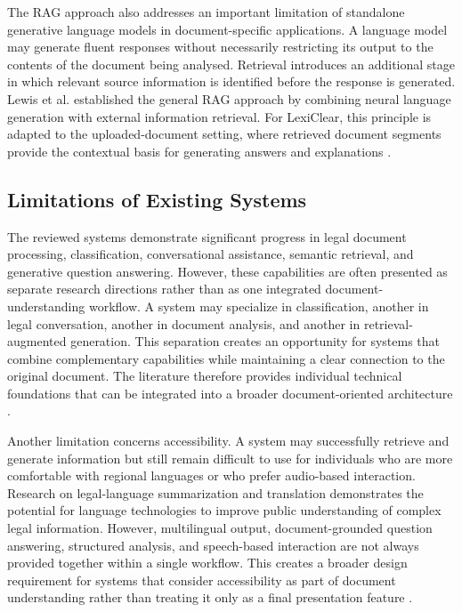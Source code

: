 \documentclass[12pt,a4paper,oneside]{report}
\begin{document}
The RAG approach also addresses an important limitation of standalone
generative language models in document-specific applications. A language
model may generate fluent responses without necessarily restricting its
output to the contents of the document being analysed. Retrieval introduces
an additional stage in which relevant source information is identified before
the response is generated. Lewis et al. established the general RAG approach
by combining neural language generation with external information retrieval.
For LexiClear, this principle is adapted to the uploaded-document setting,
where retrieved document segments provide the contextual basis for generating
answers and explanations
\cite{lewis2020rag,jurisai2025}.

\subsection{Limitations of Existing Systems}

The reviewed systems demonstrate significant progress in legal document
processing, classification, conversational assistance, semantic retrieval,
and generative question answering. However, these capabilities are often
presented as separate research directions rather than as one integrated
document-understanding workflow. A system may specialize in classification,
another in legal conversation, another in document analysis, and another in
retrieval-augmented generation. This separation creates an opportunity for
systems that combine complementary capabilities while maintaining a clear
connection to the original document. The literature therefore provides
individual technical foundations that can be integrated into a broader
document-oriented architecture
\cite{mahoney2019,kandula2023,jurisai2025}.

Another limitation concerns accessibility. A system may successfully retrieve
and generate information but still remain difficult to use for individuals
who are more comfortable with regional languages or who prefer audio-based
interaction. Research on legal-language summarization and translation
demonstrates the potential for language technologies to improve public
understanding of complex legal information. However, multilingual output,
document-grounded question answering, structured analysis, and speech-based
interaction are not always provided together within a single workflow. This
creates a broader design requirement for systems that consider accessibility
as part of document understanding rather than treating it only as a final
presentation feature
\cite{ash2024translating}.
\end{document}
